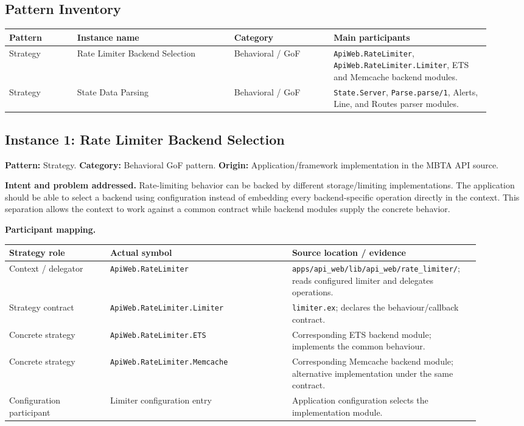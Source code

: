 \documentclass[11pt,a4paper]{article}
\newcommand{\code}[1]{\texttt{#1}}
\begin{document}
\subsection{Pattern Inventory}
\begin{longtable}{@{}p{0.13\linewidth}p{0.30\linewidth}p{0.19\linewidth}p{0.30\linewidth}@{}}
\toprule Pattern & Instance name & Category & Main participants\\ \midrule
\endhead
Strategy & Rate Limiter Backend Selection & Behavioral / GoF & \code{ApiWeb.RateLimiter}, \code{ApiWeb.RateLimiter.Limiter}, ETS and Memcache backend modules.\\
Strategy & State Data Parsing & Behavioral / GoF & \code{State.Server}, \code{Parse.parse/1}, Alerts, Line, and Routes parser modules.\\
\bottomrule
\end{longtable}

\subsection{Instance 1: Rate Limiter Backend Selection}
\textbf{Pattern:} Strategy. \textbf{Category:} Behavioral GoF pattern. \textbf{Origin:} Application/framework implementation in the MBTA API source.

\textbf{Intent and problem addressed.} Rate-limiting behavior can be backed by different storage/limiting implementations. The application should be able to select a backend using configuration instead of embedding every backend-specific operation directly in the context. This separation allows the context to work against a common contract while backend modules supply the concrete behavior.

\textbf{Participant mapping.}
\begin{longtable}{@{}p{0.20\linewidth}p{0.36\linewidth}p{0.34\linewidth}@{}}
\toprule Strategy role & Actual symbol & Source location / evidence\\ \midrule
\endhead
Context / delegator & \code{ApiWeb.RateLimiter} & \code{apps/api\_web/lib/api\_web/rate\_limiter/}; reads configured limiter and delegates operations.\\
Strategy contract & \code{ApiWeb.RateLimiter.Limiter} & \code{limiter.ex}; declares the behaviour/callback contract.\\
Concrete strategy & \code{ApiWeb.RateLimiter.ETS} & Corresponding ETS backend module; implements the common behaviour.\\
Concrete strategy & \code{ApiWeb.RateLimiter.Memcache} & Corresponding Memcache backend module; alternative implementation under the same contract.\\
Configuration participant & Limiter configuration entry & Application configuration selects the implementation module.\\
\bottomrule
\end{longtable}
\end{document}
